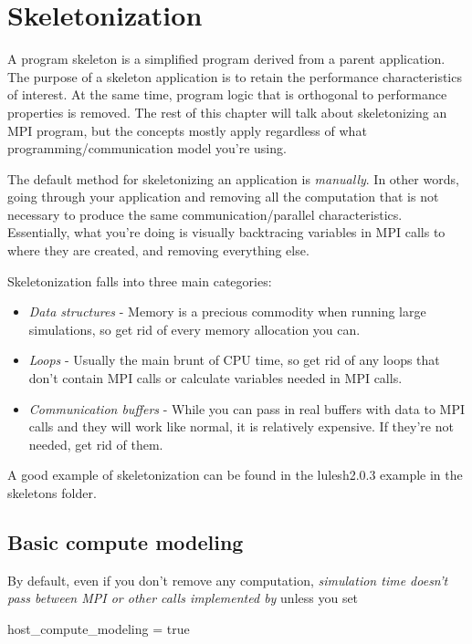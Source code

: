 \section{Skeletonization}

A program skeleton is a simplified program derived from a parent application. The purpose of a skeleton application is to retain the performance characteristics of interest. At the same time, program logic that is orthogonal to performance properties is removed.  The rest of this chapter will talk about skeletonizing an MPI program, but the concepts mostly apply regardless of what programming/communication model you're using. 

The default method for skeletonizing an application is \textit{manually}. In other words, going through your application and removing all the computation that is not necessary to produce the same communication/parallel characteristics.   Essentially, what you're doing is visually backtracing variables in MPI calls to where they are created, and removing everything else.  

Skeletonization falls into three main categories:

\begin{itemize}
\item \textit{Data structures} - Memory is a precious commodity when running large simulations, so get rid of every memory allocation you can.
\item \textit{Loops} - Usually the main brunt of CPU time, so get rid of any loops that don't contain MPI calls or calculate variables needed in MPI calls.
\item \textit{Communication buffers} - While you can pass in real buffers with data to \sstmacro MPI calls and they will work like normal, it is relatively expensive. If they're not needed, get rid of them.
\end{itemize}

A good example of skeletonization can be found in the lulesh2.0.3 example in the skeletons folder.

\subsection{Basic compute modeling}

By default, even if you don't remove any computation, \textit{simulation time doesn't pass between MPI or other calls implemented by \sstmacro} unless you set

\begin{ViFile}
host_compute_modeling = true
\end{ViFile}

